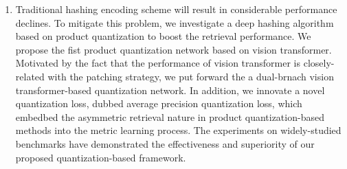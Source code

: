 \begin{abstract*}
\begin{enumerate}
  \item Traditional hashing encoding scheme will result in considerable performance declines. To mitigate this problem,  we investigate a deep hashing algorithm based on product quantization to boost the retrieval performance. We propose the fist product quantization network based on vision transformer. Motivated by the fact that the performance of vision transformer is closely-related with the patching strategy, we put forward the a dual-brnach vision transformer-based quantization network. In addition, we innovate a novel quantization loss, dubbed average precision quantization loss, which embedbed the asymmetric retrieval nature in product quantization-based methods into the metric learning process. The experiments on widely-studied benchmarks have demonstrated the effectiveness and superiority of our proposed quantization-based framework.
\end{enumerate}
\end{abstract*} 


